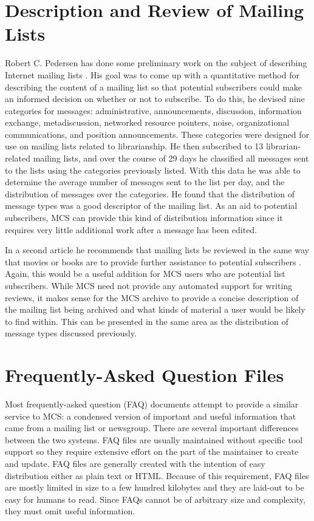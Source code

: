 \section{Description and Review of Mailing Lists}
Robert C. Pedersen has done some preliminary work on the subject of describing
Internet mailing lists \cite{pedersen1-96}. His goal was to come up with a
quantitative method for describing the content of a mailing list so that
potential subscribers could make an informed decision on whether or not to
subscribe. To do this, he devised nine categories for messages: administrative,
announcements, discussion, information exchange, metadiscussion, networked
resource pointers, noise, organizational communications, and position
announcements. These categories were designed for use on mailing lists related
to librarianship. He then subscribed to 13 librarian-related mailing lists, and
over the course of 29 days he classified all messages sent to the lists using
the categories previously listed. With this data he was able to determine the
average number of messages sent to the list per day, and the distribution of
messages over the categories. He found that the distribution of message types
was a good descriptor of the mailing list. As an aid to potential subscribers,
MCS can provide this kind of distribution information since it requires very
little additional work after a message has been edited.

In a second article he recommends that mailing lists be reviewed in the same
way that movies or books are to provide further assistance to potential
subscribers \cite{pedersen2-96}. Again, this would be a useful addition for MCS
users who are potential list subscribers. While MCS need not provide any
automated support for writing reviews, it makes sense for the MCS archive to
provide a concise description of the mailing list being archived and what kinds 
of material a user would be likely to find within. This can be presented in the 
same area as the distribution of message types discussed previously.

\section{Frequently-Asked Question Files}
Most frequently-asked question (FAQ) documents attempt to provide a similar
service to MCS: a condensed version of important and useful information that
came from a mailing list or newsgroup. There are several important differences
between the two systems. FAQ files are usually maintained without specific tool
support so they require extensive effort on the part of the maintainer to
create and update. FAQ files are generally created with the intention of easy
distribution either as plain text or HTML. Because of this requirement, FAQ
files are mostly limited in size to a few hundred kilobytes and they are
laid-out to be easy for humans to read. Since FAQs cannot be of arbitrary size
and complexity, they must omit useful information.


